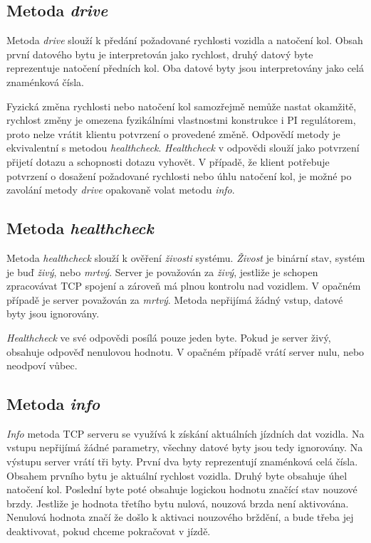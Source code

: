 \documentclass[czech, bachelor]{diploma}
\begin{document}
\subsection{Metoda \emph{drive}}
Metoda \emph{drive} slouží k předání požadované rychlosti vozidla a natočení kol. Obsah první datového bytu je interpretován jako
rychlost, druhý datový byte reprezentuje natočení předních kol. Oba datové byty jsou interpretovány jako celá znaménková čísla.

Fyzická změna rychlosti nebo natočení kol samozřejmě nemůže nastat okamžitě, rychlost změny je omezena fyzikálními vlastnostmi
konstrukce i PI regulátorem, proto nelze vrátit klientu potvrzení o provedené změně. Odpovědí metody je ekvivalentní s metodou
\emph{healthcheck}. \emph{Healthcheck} v odpovědi slouží jako potvrzení přijetí dotazu a schopnosti dotazu vyhovět. V případě,
že klient potřebuje potvrzení o dosažení požadované rychlosti nebo úhlu natočení kol, je možné po zavolání metody \emph{drive}
opakovaně volat metodu \emph{info}.

\subsection{Metoda \emph{healthcheck}}
Metoda \emph{healthcheck} slouží k ověření \emph{živosti} systému. \emph{Živost} je binární stav, systém je buď \emph{živý}, nebo
\emph{mrtvý}. Server je považován za \emph{živý}, jestliže je schopen zpracovávat TCP spojení a zároveň má plnou kontrolu
nad vozidlem. V opačném případě je server považován za \emph{mrtvý}. Metoda nepřijímá žádný vstup, datové byty jsou ignorovány.

\emph{Healthcheck} ve své odpovědi posílá pouze jeden byte. Pokud je server živý, obsahuje odpověď nenulovou hodnotu. V opačném
případě vrátí server nulu, nebo neodpoví vůbec.

\subsection{Metoda \emph{info}}
\emph{Info} metoda TCP serveru se využívá k získání aktuálních jízdních dat vozidla. Na vstupu nepřijímá žádné parametry, všechny
datové byty jsou tedy ignorovány. Na výstupu server vrátí tři byty. První dva byty reprezentují znaménková celá čísla. Obsahem
prvního bytu je aktuální rychlost vozidla. Druhý byte obsahuje úhel natočení kol. Poslední byte poté obsahuje logickou hodnotu
značící stav nouzové brzdy. Jestliže je hodnota třetího bytu nulová, nouzová brzda není aktivována. Nenulová hodnota značí
že došlo k aktivaci nouzového brždění, a bude třeba jej deaktivovat, pokud chceme pokračovat v jízdě.
\end{document}
